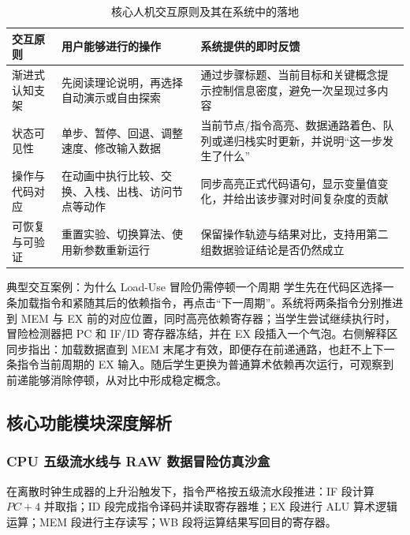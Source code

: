 \documentclass[UTF8,a4paper,11pt]{ctexart}
\begin{document}
\begin{table}[htbp]
\centering
\small
\caption{核心人机交互原则及其在系统中的落地}
\begin{tabularx}{\textwidth}{p{3.1cm}Xp{5.2cm}}
\toprule
\textbf{交互原则} & \textbf{用户能够进行的操作} & \textbf{系统提供的即时反馈} \\
\midrule
渐进式认知支架 & 先阅读理论说明，再选择自动演示或自由探索 & 通过步骤标题、当前目标和关键概念提示控制信息密度，避免一次呈现过多内容 \\
状态可见性 & 单步、暂停、回退、调整速度、修改输入数据 & 当前节点/指令高亮、数据通路着色、队列或递归栈实时更新，并说明“这一步发生了什么” \\
操作与代码对应 & 在动画中执行比较、交换、入栈、出栈、访问节点等动作 & 同步高亮正式代码语句，显示变量值变化，并给出该步骤对时间复杂度的贡献 \\
可恢复与可验证 & 重置实验、切换算法、使用新参数重新运行 & 保留操作轨迹与结果对比，支持用第二组数据验证结论是否仍然成立 \\
\bottomrule
\end{tabularx}
\end{table}

\begin{keypointbox}{典型交互案例：为什么 Load-Use 冒险仍需停顿一个周期}
学生先在代码区选择一条加载指令和紧随其后的依赖指令，再点击“下一周期”。系统将两条指令分别推进到 MEM 与 EX 前的对应位置，同时高亮依赖寄存器；当学生尝试继续执行时，冒险检测器把 PC 和 IF/ID 寄存器冻结，并在 EX 段插入一个气泡。右侧解释区同步指出：加载数据直到 MEM 末尾才有效，即便存在前递通路，也赶不上下一条指令当前周期的 EX 输入。随后学生更换为普通算术依赖再次运行，可观察到前递能够消除停顿，从对比中形成稳定概念。
\end{keypointbox}

\subsection{核心功能模块深度解析}

\subsubsection{CPU 五级流水线与 RAW 数据冒险仿真沙盒}
在离散时钟生成器的上升沿触发下，指令严格按五级流水段推进：IF 段计算 $PC+4$ 并取指；ID 段完成指令译码并读取寄存器堆；EX 段进行 ALU 算术逻辑运算；MEM 段进行主存读写；WB 段将运算结果写回目的寄存器。
\end{document}
